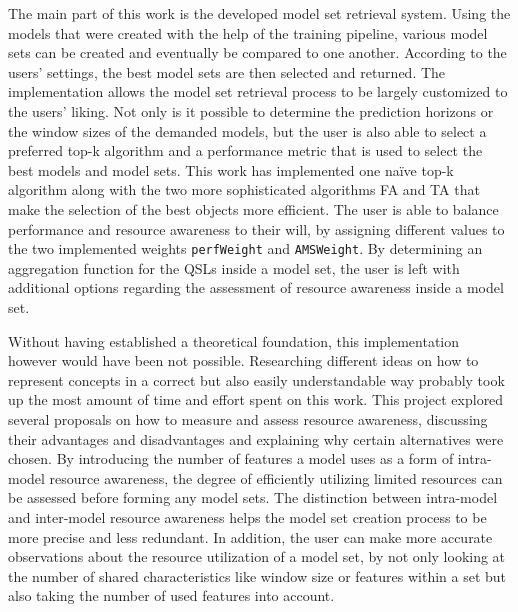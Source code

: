 The main part of this work is the developed model set retrieval system. Using the models that were created with the help of the training pipeline, various model sets can be created and eventually be compared to one another. According to the users’ settings, the best model sets are then selected and returned. The implementation allows the model set retrieval process to be largely customized to the users’ liking. Not only is it possible to determine the prediction horizons or the window sizes of the demanded models, but the user is also able to select a preferred top-k algorithm and a performance metric that is used to select the best models and model sets. This work has implemented one naïve top-k algorithm along with the two more sophisticated algorithms FA and TA that make the selection of the best objects more efficient. The user is able to balance performance and resource awareness to their will, by assigning different values to the two implemented weights \texttt{perfWeight} and \texttt{AMSWeight}. By determining an aggregation function for the QSLs inside a model set, the user is left with additional options regarding the assessment of resource awareness inside a model set.


Without having established a theoretical foundation, this implementation however would have been not possible. Researching different ideas on how to represent concepts in a correct but also easily understandable way probably took up the most amount of time and effort spent on this work. This project explored several proposals on how to measure and assess resource awareness, discussing their advantages and disadvantages and explaining why certain alternatives were chosen. By introducing the number of features a model uses as a form of intra-model resource awareness, the degree of efficiently utilizing limited resources can be assessed before forming any model sets. The distinction between intra-model and inter-model resource awareness helps the model set creation process to be more precise and less redundant. In addition, the user can make more accurate observations about the resource utilization of a model set, by not only looking at the number of shared characteristics like window size or features within a set but also taking the number of used features into account.

